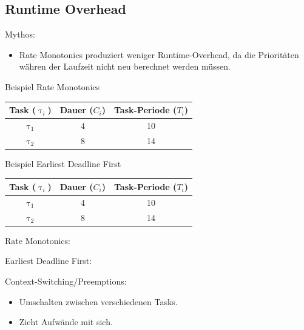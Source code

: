 \subsection{Runtime Overhead}\label{RuntimeOverhead}
\begin{frame}{\subsecname}
	Mythos:
	\begin{itemize}
		\item Rate Monotonics produziert weniger Runtime-Overhead, da die Prioritäten währen der Laufzeit nicht neu berechnet werden müssen.
	\end{itemize}
\end{frame}

\newcommand{\showRMSlideRO}[1] {\begin{frame}{Beispiel Rate Monotonics}
	\begin{center}
		\begin{tabular}{c||c|c}
			Task ($\uptau_i$) & Dauer ($C_i$) & Task-Periode ($T_i$)\\\hline\hline
			$\uptau_1$ & 4 & 10\\
			$\uptau_2$ & 8 & 14
		\end{tabular}
	\end{center}
	
\end{frame}}

%
{%
	\showRMSlideRO{\arabic{ct}}
}

\begin{frame}{Beispiel Earliest Deadline First}
	\begin{center}
		\begin{tabular}{c||c|c}
			Task ($\uptau_i$) & Dauer ($C_i$) & Task-Periode ($T_i$)\\\hline\hline
			$\uptau_1$ & 4 & 10\\
			$\uptau_2$ & 8 & 14
		\end{tabular}
	\end{center}
	
\end{frame}

\begin{frame}{\subsecname}
	Rate Monotonics:
	
	Earliest Deadline First:
	
\end{frame}

\begin{frame}{\subsecname}
	Context-Switching/Preemptions:
	\begin{itemize}
		\item Umschalten zwischen verschiedenen Tasks.
		\item Zieht Aufwände mit sich.
	\end{itemize}
\end{frame}

